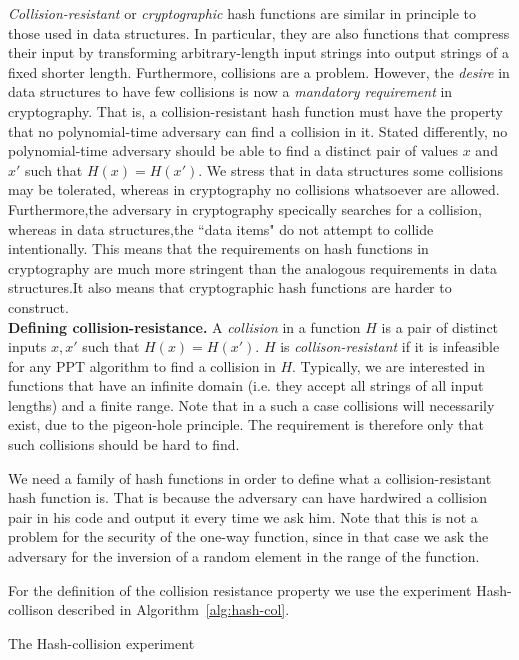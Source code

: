 \emph{Collision-resistant} or \emph{cryptographic} hash functions are similar in principle to those used in data structures. In particular, they are also functions that compress their input by transforming arbitrary-length input strings into output strings of a fixed shorter length. Furthermore, collisions are a problem. However, the \emph{desire} in data structures to have few collisions is now a \emph{mandatory requirement} in cryptography. That is, a collision-resistant hash function must have the property that no polynomial-time adversary can find a collision in it. Stated differently, no polynomial-time adversary should be able to find a distinct pair of values $x$ and $x'$ such that $H(x) = H(x')$. 
We stress that in data structures some collisions may be tolerated, whereas in cryptography no collisions whatsoever are allowed. Furthermore,the adversary in cryptography specically searches for a collision, whereas in data structures,the ``data items" do not attempt to collide intentionally. This means that the requirements on hash functions in cryptography are much more stringent than the analogous requirements in data structures.It also means that cryptographic hash functions are harder to construct.\\

\noindent
\textbf{Defining collision-resistance.}
A \emph{collision} in a function $H$ is a pair of distinct inputs $x, x'$ such that $H(x) = H(x')$. $H$ is \emph{collison-resistant} if it is infeasible for any PPT algorithm to find a collision in $H$. Typically, we are interested in functions that have an infinite domain (i.e. they accept all strings of all input lengths) and a finite range. Note that in a such a case collisions will necessarily exist, due to the pigeon-hole principle. The requirement is therefore only that such collisions should be hard to find. 

We need a family of hash functions in order to define what a collision-resistant hash function is. That is because the adversary can have hardwired a collision pair in his code and output it every time we ask him.  Note that this is not a problem for the security of the one-way function, since in that case we ask the adversary for the inversion of a random element in the range of the function.
 
For the definition of the collision resistance property we use the experiment \textsf{Hash-collison} described in Algorithm~\ref{alg:hash-col}.

\begin{algorithm}[h]
		\caption{\label{alg:hash-col} The \textsf{Hash-collision} experiment}
		\begin{algorithmic}[1]
					\State{}
				\EndIf
				\State{}
			\EndFunction
		\end{algorithmic}
\end{algorithm}

